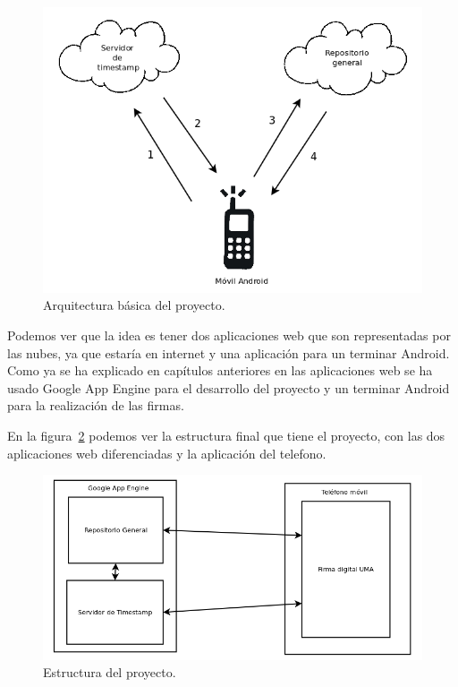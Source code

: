 \begin{figure}
  \centering
    \includegraphics[scale=0.3]{./DisenhoYArquitectura/imagenes/arquitecturaBasica.png}
  \caption{Arquitectura básica del proyecto.}
  \label{fig:arquitecturaBasica}
\end{figure}

Podemos ver que la idea es tener dos aplicaciones web que son representadas por las nubes, ya que estaría en internet y una aplicación para un terminar Android. Como ya se ha explicado en capítulos anteriores en las aplicaciones web se ha usado Google App Engine para el desarrollo del proyecto y un terminar Android para la realización de las firmas. 

En la figura~\ref{fig:estructura} podemos ver la estructura final que tiene el proyecto, con las dos aplicaciones web diferenciadas y la aplicación del telefono.

\begin{figure}
  \centering
    \includegraphics[scale=0.3]{./DisenhoYArquitectura/imagenes/estructura.png}
  \caption{Estructura del proyecto.}
  \label{fig:estructura}
\end{figure}

